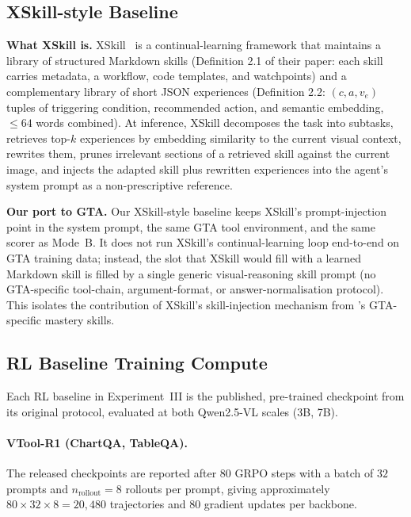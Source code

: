 \subsection{XSkill-style Baseline}
\label{app:xskill_baseline}

\textbf{What XSkill is.}
XSkill~\citep{DBLP:journals/corr/abs-2603-12056} is a continual-learning framework that
maintains a library of structured Markdown skills (Definition 2.1 of their paper: each
skill carries metadata, a workflow, code templates, and watchpoints) and a complementary
library of short JSON experiences (Definition 2.2: $(c, a, v_e)$ tuples of triggering
condition, recommended action, and semantic embedding, $\leq 64$ words combined). At
inference, XSkill decomposes the task into subtasks, retrieves top-$k$ experiences by
embedding similarity to the current visual context, rewrites them, prunes irrelevant
sections of a retrieved skill against the current image, and injects the adapted skill
plus rewritten experiences into the agent's system prompt as a non-prescriptive reference.

\textbf{Our port to GTA.}
Our XSkill-style baseline keeps XSkill's prompt-injection point in the system prompt, the
same GTA tool environment, and the same scorer as \sysname{} Mode~B. It does not run
XSkill's continual-learning loop end-to-end on GTA training data; instead, the slot that
XSkill would fill with a learned Markdown skill is filled by a single generic
visual-reasoning skill prompt (no GTA-specific tool-chain, argument-format, or
answer-normalisation protocol). This isolates the contribution of XSkill's
skill-injection mechanism from \sysname{}'s GTA-specific mastery skills.

\subsection{RL Baseline Training Compute}
\label{app:rl_cost}

Each RL baseline in Experiment~III is the published, pre-trained checkpoint from its
original protocol, evaluated at both Qwen2.5-VL scales (3B, 7B).

\paragraph{VTool-R1 (ChartQA, TableQA).}
The released checkpoints are reported after $80$ GRPO steps with a batch of $32$ prompts
and $n_{\text{rollout}}{=}8$ rollouts per prompt, giving approximately
$80 \times 32 \times 8 = 20{,}480$ trajectories and $80$ gradient updates per backbone.


